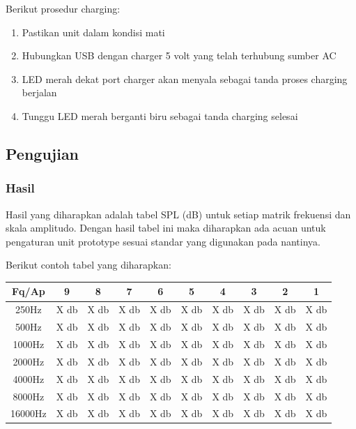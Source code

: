 \documentclass[12pt,]{article}
\begin{document}
	Berikut prosedur charging:
	\begin{enumerate}
		\item Pastikan unit dalam kondisi mati
		\item Hubungkan USB dengan charger 5 volt yang telah terhubung sumber AC
		\item LED merah dekat port charger akan menyala sebagai tanda proses charging berjalan
		\item Tunggu LED merah berganti biru sebagai tanda charging selesai
	\end{enumerate}

	\newpage
	\subsection{Pengujian}
	
	\subsubsection{Hasil}
	
	Hasil yang diharapkan adalah tabel SPL (dB) untuk setiap matrik frekuensi dan skala amplitudo.
	Dengan hasil tabel ini maka diharapkan ada acuan untuk pengaturan unit prototype sesuai standar yang digunakan pada nantinya.
	
	Berikut contoh tabel yang diharapkan:
	
	\begin{center}
		\begin{tabular}{|c|c|c|c|c|c|c|c|c|c|} 
			\hline
			Fq/Ap & 9 & 8 & 7 & 6 & 5 & 4 & 3 & 2 & 1\\ [0.5ex] 
			\hline\hline
			250Hz & X db & X db & X db & X db & X db & X db & X db & X db & X db\\
			\hline
			500Hz & X db & X db & X db & X db & X db & X db & X db & X db & X db\\
			\hline
			1000Hz & X db & X db & X db & X db & X db & X db & X db & X db & X db\\
			\hline
			2000Hz & X db & X db & X db & X db & X db & X db & X db & X db & X db\\
			\hline
			4000Hz & X db & X db & X db & X db & X db & X db & X db & X db & X db\\
			\hline
			8000Hz & X db & X db & X db & X db & X db & X db & X db & X db & X db\\
			\hline
			16000Hz & X db & X db & X db & X db & X db & X db & X db & X db & X db\\
			\hline
		\end{tabular}
	\end{center}
	
\end{document}
